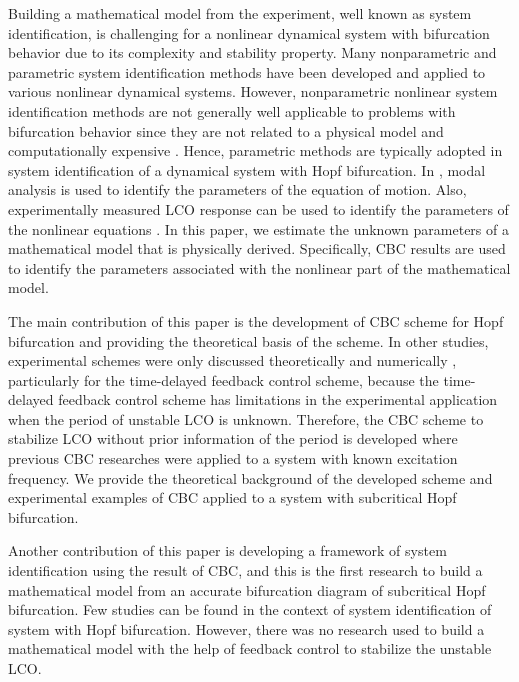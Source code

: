\documentclass[openacc]{rsproca_new}%
\theoremstyle{own}
\begin{document}
Building a mathematical model from the experiment, well known as system identification, is challenging for a nonlinear dynamical system with bifurcation behavior due to its complexity and stability property. Many nonparametric and parametric system identification methods have been developed and applied to various nonlinear dynamical systems. However, nonparametric nonlinear system identification methods are not generally well applicable to problems with bifurcation behavior since they are not related to a physical model and computationally expensive \cite{thothadri2005nonlinear}. Hence, parametric methods are typically adopted in system identification of a dynamical system with Hopf bifurcation. In \cite{fichera2014experimental}, modal analysis is used to identify the parameters of the equation of motion. Also, experimentally measured LCO response can be used to identify the parameters of the nonlinear equations \cite{abdelkefi2013analytical}. In this paper, we estimate the unknown parameters of a mathematical model that is physically derived. Specifically, CBC results are used to identify the parameters associated with the nonlinear part of the mathematical model.

The main contribution of this paper is the development of CBC scheme for Hopf bifurcation and providing the theoretical basis of the scheme. In other studies, experimental schemes were only discussed theoretically and numerically \cite{brown2011time,postlethwaite2013feedback}, particularly for the time-delayed feedback control scheme, because the time-delayed feedback control scheme has limitations in the experimental application when the period of unstable LCO is unknown. Therefore, the CBC scheme to stabilize LCO without prior information of the period is developed where previous CBC researches were applied to a system with known excitation frequency. We provide the theoretical background of the developed scheme and experimental examples of CBC applied to a system with subcritical Hopf bifurcation.

Another contribution of this paper is developing a framework of system identification using the result of CBC, and this is the first research to build a mathematical model from an accurate bifurcation diagram of subcritical Hopf bifurcation. Few studies \cite{abdelkefi2013analytical,thothadri2005nonlinear} can be found in the context of system identification of system with Hopf bifurcation. However, there was no research used to build a mathematical model with the help of feedback control to stabilize the unstable LCO.
\end{document}
